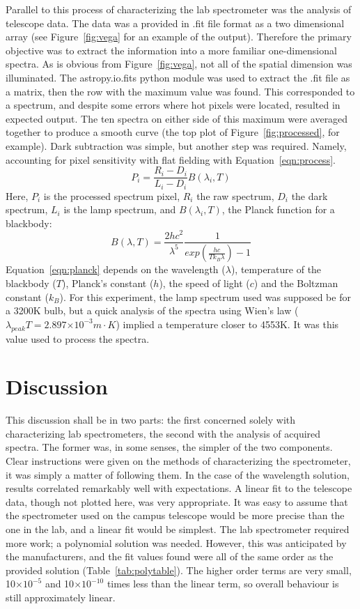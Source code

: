\documentclass[a4paper,12pt]{article}
\providecommand{\e}[1]{\ensuremath{\times 10^{#1}}}
\begin{document}
Parallel to this process of characterizing the lab spectrometer was the analysis of telescope data. The data was a provided in .fit file format as a two dimensional array (see Figure~\ref{fig:vega} for an example of the output). Therefore the primary objective was to extract the information into a more familiar one-dimensional spectra. As is obvious from Figure~\ref{fig:vega}, not all of the spatial dimension was illuminated. The astropy.io.fits python module was used to extract the .fit file as a matrix, then the row with the maximum value was found. This corresponded to a spectrum, and despite some errors where hot pixels were located, resulted in expected output. The ten spectra on either side of this maximum were averaged together to produce a smooth curve (the top plot of Figure~\ref{fig:processed}, for example). Dark subtraction was simple, but another step was required. Namely, accounting for pixel sensitivity with flat fielding with Equation~\ref{eqn:process}.
\begin{equation}
\label{eqn:process}
P_i=\frac{R_i-D_i}{L_i-D_i}B(\lambda_i,T)
\end{equation}
Here, $P_i$ is the processed spectrum pixel, $R_i$ the raw spectrum, $D_i$ the dark spectrum, $L_i$ is the lamp spectrum, and $B(\lambda_i,T)$, the Planck function for a blackbody:
\begin{equation}
\label{eqn:planck}
B(\lambda,T)=\frac{2hc^2}{\lambda^5}\frac{1}{exp(\frac{hc}{Tk_B\lambda})-1}
\end{equation}
Equation~\ref{eqn:planck} depends on the wavelength ($\lambda$), temperature of the blackbody ($T$), Planck's constant ($h$), the speed of light ($c$) and the Boltzman constant ($k_B$). For this experiment, the lamp spectrum used was supposed be for a 3200K bulb, but a quick analysis of the spectra using Wien's law ($\lambda_{peak}T= 2.897\e{-3}m\cdot K$) implied a temperature closer to 4553K. It was this value used to process the spectra.
\section{Discussion}
\label{sec:discussion}

This discussion shall be in two parts: the first concerned solely with characterizing lab spectrometers, the second with the analysis of acquired spectra. The former was, in some senses, the simpler of the two components. Clear instructions were given on the methods of characterizing the spectrometer, it was simply a matter of following them. In the case of the wavelength solution, results correlated remarkably well with expectations. A linear fit to the telescope data, though not plotted here, was very appropriate. It was easy to assume that the spectrometer used on the campus telescope would be more precise than the one in the lab, and a linear fit would be simplest. The lab spectrometer required more work; a polynomial solution was needed. However, this was anticipated by the manufacturers, and the fit values found were all of the same order as the provided solution (Table~\ref{tab:polytable}). The higher order terms are very small, 10\e{-5} and 10\e{-10} times less than the linear term, so overall behaviour is still approximately linear. 
\end{document}
